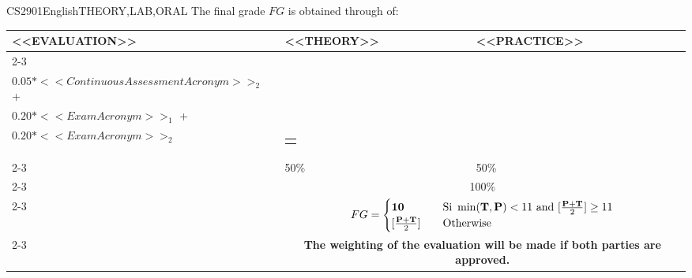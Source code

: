   \begin{evaluation}{CS2901}{English}{THEORY,LAB,ORAL}
  The final grade $FG$ is obtained through of:
 
  \begin{tabularx}{0.9\textwidth}{|X|p{}|p{}|} \hline
    \multirow{4}{*}{\uppercase{<<Evaluation>>}} & \uppercase{<<Theory>>} & \uppercase{<<Practice>>} \\ \cline{2-3}
    & %
        \begin{minipage}{0.95\textwidth}
        \begin{tabular}{l}
            $\text{\textbf{T}} = 0.05*<<ContinuousAssessmentAcronym>>_{1}$  + \\
            $0.05*<<ContinuousAssessmentAcronym>>_{2}$  + \\
            $0.20*<<ExamAcronym>>_{1}$  + \\  
            $0.20*<<ExamAcronym>>_{2}$  
            \end{tabular}
        \end{minipage}
    & %
        \begin{minipage}{0.95\textwidth}
        \begin{tabular}{l}
            $\text{\textbf{P}} =0.2(A + D) + 0.3(Dev) + 0.3(DF)$ 
        \end{tabular}
        \end{minipage}                 \\ \cline{2-3}
  
    & %
    50\% 
    & %
    50\% \\ \cline{2-3}
    & \multicolumn{2}{c|}{100\%}  \\ \cline{2-3}
    & \multicolumn{2}{c|}{
      \begin{math}
        FG =
        \begin{cases}
          \text{\textbf{10}}   & \quad \text{Si } \min(\text{\textbf{T}},\text{\textbf{P}}) < 11 \text{ and }  [\frac{\textbf{P} + \text{\textbf{T}}}{2}] \geq  11\\
          [\frac{\textbf{P} + \text{\textbf{T}}}{2}]    & \quad \text{Otherwise}
        \end{cases}
      \end{math}
    } \\ \cline{2-3}
    & \multicolumn{2}{c|}{\textbf{The weighting of the evaluation will be made if both parties are approved.}}  \\ \hline
    \end{tabularx}
    

\end{evaluation}
